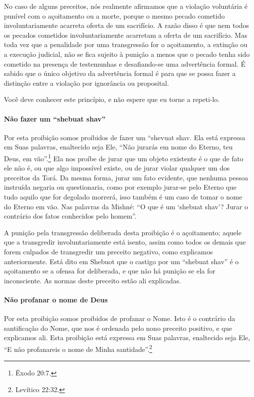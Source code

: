 No caso de alguns preceitos, nós realmente afirmamos que a violação
voluntária é punível com o açoitamento ou a morte, porque o mesmo
pecado cometido involuntariamente acarreta oferta de um sacrifício. A
razão disso é que nem todos os pecados cometidos involuntariamente
acarretam a oferta de um sacrifício. Mas toda vez que a penalidade por
uma transgressão for o açoitamento, a extinção ou a execução judicial,
não se fica sujeito à punição a menos que o pecado tenha sido cometido
na presença de testemunhas e desafiando-se uma advertência formal. É
sabido que o único objetivo da advertência formal é para que se possa
fazer a distinção entre a violação por ignorância ou proposital.

Você deve conhecer este princípio, e não espere que eu torne a repeti-lo.

\paragraph{Não fazer um ``shebuat shav''}

Por esta proibição somos proibidos de fazer um ``shevuat shav\starr.
Ela está expressa em Suas palavras, enaltecido seja
Ele, ``Não jurarás em nome do Eterno, teu Deus, em vão''.\footnote{Êxodo 20:7.}
Ela nos proíbe de jurar que um objeto existente é o que de fato ele não
é, ou que algo impossível existe, ou de jurar violar qualquer um dos
preceitos da Torá. Da mesma forma, jurar um fato evidente, que nenhuma
pessoa instruída negaria ou questionaria, como por exemplo jurar-se
pelo Eterno que tudo aquilo que for degolado morrerá, isso também é um
caso de tomar o nome do Eterno em vão. Nas palavras da Mishné: ``O que é
um `shebuat shav'? Jurar o contrário dos fatos conhecidos pelo homem''.

A punição pela transgressão deliberada desta proibição é o açoitamento;
aquele que a transgredir involuntariamente está isento, assim como
todos os demais que forem culpados de transgredir um preceito negativo,
como explicamos anteriormente. Está dito em Shebuot que o castigo por um
``shebuat shav'' é o açoitamento se a ofensa for deliberada, e que não
há punição se ela for inconsciente. As normas deste preceito estão ali
explicadas.

\paragraph{Não profanar o nome de Deus}

Por esta proibição somos proibidos de profanar o Nome. Isto é o
contrário da santificação do Nome, que nos é ordenada pelo nono preceito
positivo, e que explicamos ali. Esta proibição está expressa em Suas
palavras, enaltecido seja Ele, ``E não profanareis o nome de Minha
santidade''.\footnote{Levítico 22:32.}

